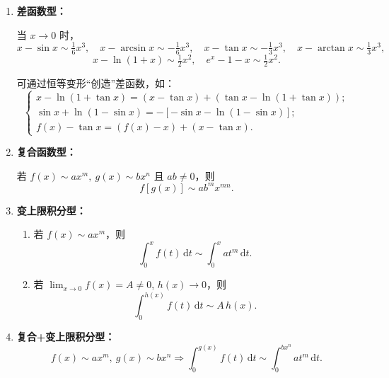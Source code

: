 \begin{enumerate}
\begin{enumerate}
              \item \textbf{差函数型：}

                    当 $x\to0$ 时，
                    \[
                        x - \sin x \sim \tfrac{1}{6}x^3, \quad
                        x - \arcsin x \sim -\tfrac{1}{6}x^3, \quad
                        x - \tan x \sim -\tfrac{1}{3}x^3, \quad
                        x - \arctan x \sim \tfrac{1}{3}x^3,
                    \]
                    \[
                        x - \ln(1+x) \sim \tfrac{1}{2}x^2,
                        \quad e^x - 1 - x \sim \tfrac{1}{2}x^2.
                    \]

                    可通过恒等变形“创造”差函数，如：
                    \[
                        \begin{cases}
                            x - \ln(1+\tan x) = (x - \tan x) + (\tan x - \ln(1+\tan x)); \\[4pt]
                            \sin x + \ln(1 - \sin x) = -[-\sin x - \ln(1 - \sin x)];     \\[4pt]
                            f(x) - \tan x = (f(x) - x) + (x - \tan x).
                        \end{cases}
                    \]

              \item \textbf{复合函数型：}

                    若 $f(x)\sim ax^m,\ g(x)\sim bx^n$ 且 $ab\ne0$，则
                    \[
                        f[g(x)] \sim ab^m x^{mn}.
                    \]

              \item \textbf{变上限积分型：}
                    \begin{enumerate}
                        \item 若 $f(x)\sim ax^m$，则
                              \[
                                  \int_0^x f(t)\,\mathrm{d}t \sim \int_0^x a t^m\,\mathrm{d}t.
                              \]
                        \item 若 $\lim_{x\to0}f(x)=A\ne0$, $h(x)\to0$，则
                              \[
                                  \int_0^{h(x)} f(t)\,\mathrm{d}t \sim A\,h(x).
                              \]
                    \end{enumerate}

              \item \textbf{复合+变上限积分型：}
                    \[
                        f(x)\sim ax^m,\ g(x)\sim bx^n
                        \Rightarrow
                        \int_0^{g(x)}f(t)\,\mathrm{d}t \sim \int_0^{bx^n}a t^m\,\mathrm{d}t.
                    \]


\end{enumerate}
\end{enumerate}
